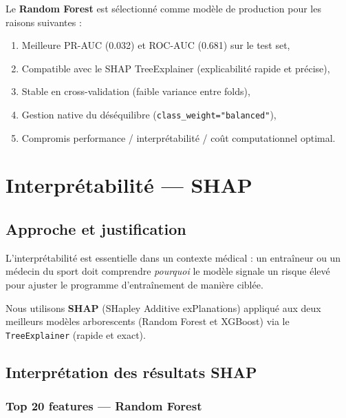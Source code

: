 \documentclass[12pt,a4paper]{report}
\begin{document}
\begin{resultbox}[title=Modèle recommandé : Random Forest]
Le \textbf{Random Forest} est sélectionné comme modèle de production pour les raisons suivantes :
\begin{enumerate}
  \item Meilleure PR-AUC (0.032) et ROC-AUC (0.681) sur le test set,
  \item Compatible avec le SHAP TreeExplainer (explicabilité rapide et précise),
  \item Stable en cross-validation (faible variance entre folds),
  \item Gestion native du déséquilibre (\texttt{class\_weight="balanced"}),
  \item Compromis performance / interprétabilité / coût computationnel optimal.
\end{enumerate}
\end{resultbox}

\chapter{Interprétabilité — SHAP}

\section{Approche et justification}

L'interprétabilité est essentielle dans un contexte médical : un entraîneur ou un médecin
du sport doit comprendre \textit{pourquoi} le modèle signale un risque élevé pour ajuster
le programme d'entraînement de manière ciblée.

Nous utilisons \textbf{SHAP} (SHapley Additive exPlanations) appliqué aux deux meilleurs
modèles arborescents (Random Forest et XGBoost) via le \texttt{TreeExplainer} (rapide et exact).

\section{Interprétation des résultats SHAP}

\subsection{Top 20 features — Random Forest}
\end{document}
